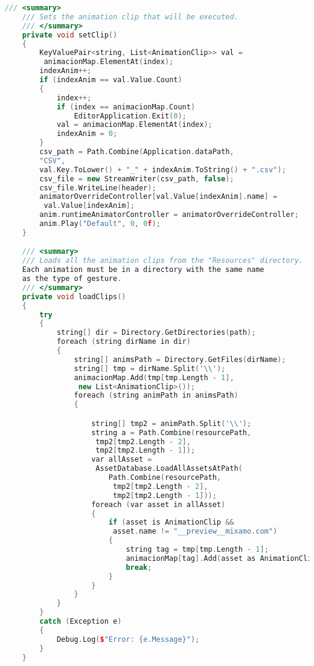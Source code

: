 \begin{lstlisting}[language=C++]
    /// <summary>
    /// Sets the animation clip that will be executed.
    /// </summary>
    private void setClip()
    {
        KeyValuePair<string, List<AnimationClip>> val = 
         animacionMap.ElementAt(index);
        indexAnim++;
        if (indexAnim == val.Value.Count)
        {
            index++;
            if (index == animacionMap.Count)
                EditorApplication.Exit(0);
            val = animacionMap.ElementAt(index);
            indexAnim = 0;
        }
        csv_path = Path.Combine(Application.dataPath, 
        "CSV", 
        val.Key.ToLower() + "_" + indexAnim.ToString() + ".csv");
        csv_file = new StreamWriter(csv_path, false);
        csv_file.WriteLine(header);
        animatorOverrideController[val.Value[indexAnim].name] = 
         val.Value[indexAnim];
        anim.runtimeAnimatorController = animatorOverrideController;
        anim.Play("Default", 0, 0f);
    }

    /// <summary>
    /// Loads all the animation clips from the "Resources" directory.
    Each animation must be in a directory with the same name 
    as the type of gesture.
    /// </summary>
    private void loadClips()
    {
        try
        {
            string[] dir = Directory.GetDirectories(path);
            foreach (string dirName in dir)
            {
                string[] animsPath = Directory.GetFiles(dirName);
                string[] tmp = dirName.Split('\\');
                animacionMap.Add(tmp[tmp.Length - 1], 
                 new List<AnimationClip>());
                foreach (string animPath in animsPath)
                {

                    string[] tmp2 = animPath.Split('\\');
                    string a = Path.Combine(resourcePath, 
                     tmp2[tmp2.Length - 2], 
                     tmp2[tmp2.Length - 1]);
                    var allAsset = 
                     AssetDatabase.LoadAllAssetsAtPath(
                        Path.Combine(resourcePath, 
                         tmp2[tmp2.Length - 2], 
                         tmp2[tmp2.Length - 1]));
                    foreach (var asset in allAsset)
                    {
                        if (asset is AnimationClip && 
                         asset.name != "__preview__mixamo.com")
                        {
                            string tag = tmp[tmp.Length - 1];
                            animacionMap[tag].Add(asset as AnimationClip);
                            break;
                        }
                    }
                }
            }
        }
        catch (Exception e)
        {
            Debug.Log($"Error: {e.Message}");
        }
    }


\end{lstlisting}
